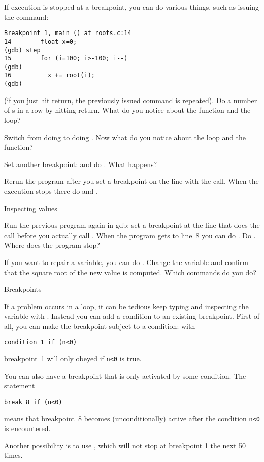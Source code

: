 If execution is stopped at a breakpoint, you can do various things,
such as issuing the  command:
\begin{verbatim}
Breakpoint 1, main () at roots.c:14
14        float x=0;
(gdb) step
15        for (i=100; i>-100; i--)
(gdb) 
16          x += root(i);
(gdb) 
\end{verbatim}
(if you just hit return, the previously issued command is
repeated). Do a number of s in a row by hitting return. What
do you notice about the function and the loop?

Switch from doing  to doing . Now what do you notice
about the loop and the function? 

Set another breakpoint:  and do . What happens?

Rerun the program after you set a breakpoint on the line with the
 call. When the execution stops there do  and
.

 {Inspecting values}

Run the previous program again in gdb: set a breakpoint at the line
that does the  call before you actually call . When the
program gets to line~8 you can do . Do . Where does
the program stop?

If you want to repair a variable, you can do . Change
the variable  and confirm that the square root of the new value
is computed. Which commands do you do?

 {Breakpoints}

If a problem occurs in a loop, it can be tedious keep typing 
and inspecting the variable with . Instead you can add a
condition to an existing breakpoint. First of all, you can make the breakpoint
subject to a condition: with
\begin{verbatim}
condition 1 if (n<0)
\end{verbatim}
breakpoint~1 will only obeyed if \texttt{n<0} is true.

You can also have a breakpoint that is only activated by some condition.
The statement
\begin{verbatim}
break 8 if (n<0)
\end{verbatim}
means that breakpoint~8 becomes (unconditionally) active after
the condition \texttt{n<0} is encountered.

Another possibility is to use , which will not stop at
breakpoint 1 the next 50 times.

